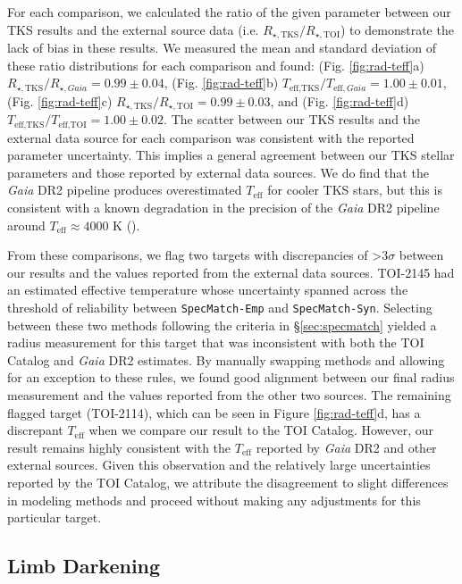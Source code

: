 \documentclass[twocolumn]{aastex63}
\begin{document}
For each comparison, we calculated the ratio of the given parameter between our TKS results and the external source data (i.e. $R_{\star, \textrm{TKS}}/R_{\star, \textrm{TOI}}$) to demonstrate the lack of bias in these results. We measured the mean and standard deviation of these ratio distributions for each comparison and found: (Fig. \ref{fig:rad-teff}a) $R_{\star, \textrm{TKS}}/R_{\star, Gaia} = 0.99 \pm 0.04$, (Fig. \ref{fig:rad-teff}b) $T_{\textrm{eff}, \textrm{TKS}}/T_{\textrm{eff}, Gaia} = 1.00 \pm 0.01$, (Fig. \ref{fig:rad-teff}c) $R_{\star, \textrm{TKS}}/R_{\star, \textrm{TOI}} = 0.99 \pm 0.03$, and (Fig. \ref{fig:rad-teff}d) $T_{\textrm{eff}, \textrm{TKS}}/T_{\textrm{eff}, \textrm{TOI}} = 1.00 \pm 0.02$. The scatter between our TKS results and the external data source for each comparison was consistent with the reported parameter uncertainty. This implies a general agreement between our TKS stellar parameters and those reported by external data sources. We do find that the \textit{Gaia} DR2 pipeline produces overestimated $T_\textrm{eff}$ for cooler TKS stars, but this is consistent with a known degradation in the precision of the \textit{Gaia} DR2 pipeline around $T_\textrm{eff} \approx 4000$ K (\citealt{Andrae18}). 

From these comparisons, we flag two targets with discrepancies of >3$\sigma$ between our results and the values reported from the external data sources. TOI-2145 had an estimated effective temperature whose uncertainty spanned across the threshold of reliability between \texttt{SpecMatch-Emp} and \texttt{SpecMatch-Syn}. Selecting between these two methods following the criteria in \S\ref{sec:specmatch} yielded a radius measurement for this target that was inconsistent with both the TOI Catalog and \textit{Gaia} DR2 estimates. By manually swapping methods and allowing for an exception to these rules, we found good alignment between our final radius measurement and the values reported from the other two sources. The remaining flagged target (TOI-2114), which can be seen in Figure \ref{fig:rad-teff}d, has a discrepant $T_\textrm{eff}$ when we compare our result to the TOI Catalog. However, our result remains highly consistent with the $T_\textrm{eff}$ reported by \textit{Gaia} DR2 and other external sources. Given this observation and the relatively large uncertainties reported by the TOI Catalog, we attribute the disagreement to slight differences in modeling methods and proceed without making any adjustments for this particular target.

\subsection{Limb Darkening}
\label{sec:limbdarkening}
\end{document}
